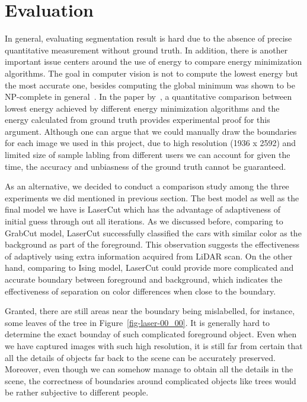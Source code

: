 \documentclass{article} %
\begin{document}
\section{Evaluation}

In general, evaluating segmentation result is hard due to the absence of precise quantitative measurement without ground truth. In addition, there is another important issue centers around the use of energy to compare energy minimization algorithms. The goal in computer vision is not to compute the lowest energy but the most accurate one, besides computing the global minimum was shown to be NP-complete in general~\citep{Boykov2001Fast}. In the paper by~\citet{Szeliski2008Comparative}, a quantitative comparison between lowest energy achieved by different energy minimization algorithms and the energy calculated from ground truth provides experimental proof for this argument. Although one can argue that we could manually draw the boundaries for each image we used in this project, due to high resolution (1936 x 2592) and limited size of sample labling from different users we can account for given the time, the accuracy and unbiasness of the ground truth cannot be guaranteed.

As an alternative, we decided to conduct a comparison study among the three experiments we did mentioned in previous section. The best model as well as the final model we have is LaserCut which has the advantage of adaptiveness of initial guess through out all iterations. As we discussed before, comparing to GrabCut model, LaserCut successfully classified the cars with similar color as the background as part of the foreground. This observation suggests the effectiveness of adaptively using extra information acquired from LiDAR scan. On the other hand, comparing to Ising model, LaserCut could provide more complicated and accurate boundary between foreground and background, which indicates the effectiveness of separation on color differences when close to the boundary.

Granted, there are still areas near the boundary being mislabelled, for instance, some leaves of the tree in Figure~\ref{fig-laser-00_00}. It is generally hard to determine the exact bounday of such complicated foreground object. Even when we have captured images with such high resolution, it is still far from certain that all the details of objects far back to the scene can be accurately preserved. Moreover, even though we can somehow manage to obtain all the details in the scene, the correctness of boundaries around complicated objects like trees would be rather subjective to different people.
\end{document}
